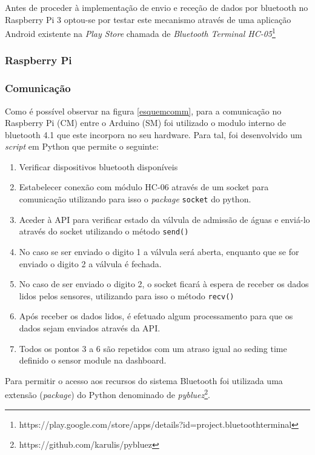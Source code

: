 Antes de proceder à implementação de envio e receção de dados por bluetooth no Raspberry Pi 3 optou-se por testar este mecanismo através de uma aplicação Android existente na \textit{Play Store} chamada de \textit{Bluetooth Terminal HC-05}\footnote{https://play.google.com/store/apps/details?id=project.bluetoothterminal}

\subsubsection{Raspberry Pi}


\subsubsection{Comunicação}


Como é possível observar na figura \ref{esquemcomm}, para a comunicação no Raspberry Pi (\ac{CM}) entre o Arduino (\ac{SM}) foi utilizado o modulo interno de bluetooth 4.1 que este incorpora no seu hardware. Para tal, foi desenvolvido um \textit{script} em Python que permite o seguinte: 


\begin{enumerate}
	\item Verificar dispositivos bluetooth disponíveis
	\item Estabelecer conexão com módulo HC-06 através de um socket para comunicação utilizando para isso o \textit{package} \texttt{socket} do python. 
	\item Aceder à API para verificar estado da válvula de admissão de águas e enviá-lo através do socket utilizando o método \texttt{send()} 
	\item No caso se ser enviado o digito 1 a válvula será aberta, enquanto que se for enviado o digito 2 a válvula é fechada. 
	\item No caso de ser enviado o digito 2, o socket ficará à espera de receber os dados lidos pelos sensores, utilizando para isso o método \texttt{recv()}
	\item Após receber os dados lidos, é efetuado algum processamento para que os dados sejam enviados através da API. 
	\item Todos os pontos 3 a 6 são repetidos com um atraso igual ao seding time definido o sensor module na dashboard. 
\end{enumerate}

Para permitir o acesso aos recursos do sistema Bluetooth foi utilizada uma extensão (\textit{package}) do Python denominado de \textit{pybluez}\footnote{https://github.com/karulis/pybluez}. 




